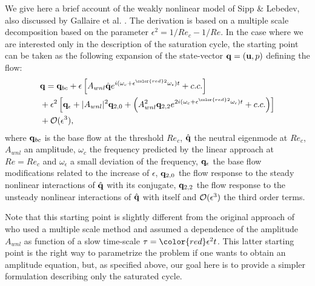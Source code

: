 \documentclass[twocolumn,10pt]{asme2ej}
\newcommand{\be}[1]{ \begin{equation} \label{#1}}
\newcommand{\ee}{\end{equation}}
\begin{document}
We give here a brief account of the weakly nonlinear model of Sipp \& 
Lebedev\cite{SippLebedev}, also discussed by Gallaire et al. \cite{FDR2016}. 
The derivation is based on a multiple scale  decomposition based on the parameter {\color{red}$\epsilon^2 = 1/Re_c - 1/Re$}. 
In the case where we are interested only in the {\color{red}description} of the saturation cycle, the starting point can be taken as the following expansion of the state-vector ${\bf{q}}=({\bf{u}},p)$ defining the flow:
\be{WNL1}
\begin{aligned}
&{\bf q} = {}  {\bf q}_{bc} + \epsilon \left[ A_{wnl}  \hat{\bf q} e^{i (\omega_c+\epsilon^{\color{red}2} \omega_\epsilon)  t} + c.c. \right]\\
&+ \epsilon^2 \left[ {\bf q}_\epsilon + |A_{wnl}|^2  {\bf q}_{2,0} + \left(  A_{wnl}^2 {\bf q}_{2,2} e^{2 i(\omega_c+\epsilon^{\color{red}2} \omega_\epsilon)  t} + c.c. \right) \right]\\
& + {\cal O}( \epsilon ^3),
\end{aligned}
\ee
where ${\bf q}_{bc}$ is the base flow at the threshold $Re_c$, $\hat{\bf q}$ the neutral 
eigenmode at $Re_c$, {\color{red} $A_{wnl}$ an amplitude,} $\omega_c$ the frequency predicted by the linear approach at $Re=Re_c$ and $\omega_\epsilon$ a small deviation of the frequency, {\color{red} ${\bf q}_{\epsilon}$ the base flow modifications related to the increase of $\epsilon$, ${\bf q}_{2,0}$ the flow response to the steady nonlinear interactions of $\hat{\bf q}$ with its conjugate, ${\bf q}_{2,2}$ the flow response to the unsteady nonlinear interactions of $\hat{\bf q}$ with itself and  ${\cal O}( \epsilon ^3)$ the third order terms.   }

Note that this starting point is slightly different from the original approach of \cite{SippLebedev} who used a multiple scale method and assumed a dependence of the amplitude $A_{wnl}$ as function of a slow time-scale $\tau = {\color{red}\epsilon^2} t$. This latter starting point is the {\color{red}right} way to parametrize the problem if one wants to obtain an amplitude equation, but{\color{red},} as specified above{\color{red},} our goal here is to provide a simpler formulation {\color{red}describing} only the saturated cycle. 
\end{document}
